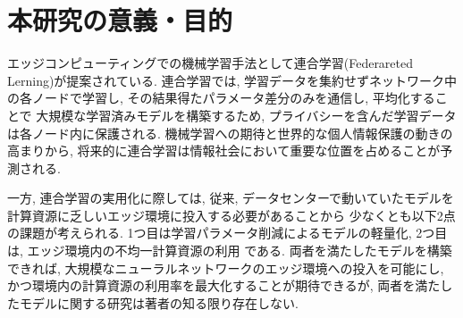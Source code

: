 \documentclass[a4paper,9pt,twocolumn]{jsarticle}
\begin{document}


\graphicspath{{./figs/}} %

\section{本研究の意義・目的}

エッジコンピューティングでの機械学習手法として連合学習(Federareted Lerning)が提案されている.
連合学習では, 学習データを集約せずネットワーク中の各ノードで学習し, 
その結果得たパラメータ差分のみを通信し, 平均化することで
大規模な学習済みモデルを構築するため, プライバシーを含んだ学習データは各ノード内に保護される.
機械学習への期待と世界的な個人情報保護の動きの高まりから, 
将来的に連合学習は情報社会において重要な位置を占めることが予測される.

一方, 連合学習の実用化に際しては, 
従来, データセンターで動いていたモデルを計算資源に乏しいエッジ環境に投入する必要があることから
少なくとも以下2点の課題が考えられる.
1つ目は学習パラメータ削減によるモデルの軽量化, 
2つ目は, エッジ環境内の不均一計算資源の利用
である.
両者を満たしたモデルを構築できれば, 
大規模なニューラルネットワークのエッジ環境への投入を可能にし, 
かつ環境内の計算資源の利用率を最大化することが期待できるが,  
両者を満たしたモデルに関する研究は著者の知る限り存在しない.
\end{document}
